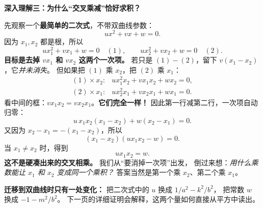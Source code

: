 \begin{explanationbox}
\textbf{深入理解三：为什么“交叉乘减”恰好求积？}

先观察一个\textbf{最简单的二次式}，不带双曲线参数：
\[
 ux^2+vx+w=0.
\]
因为 $x_1,x_2$ 都是根，所以
\[
 ux_1^2+vx_1+w=0\quad(1),\qquad
 ux_2^2+vx_2+w=0\quad(2).
\]
\textbf{目标是去掉 $vx_1$ 和 $vx_2$ 这两个一次项。}
若只是 $(1)-(2)$，留下 $v(x_1-x_2)$，它\emph{并未消失}。
但如果把 $(1)$ 乘 $x_2$，把 $(2)$ 乘 $x_1$：
\[
\begin{array}{rcl}
 (1)\times x_2: & ux_1^2x_2+\boxed{vx_1x_2}+wx_2=0,\\[3pt]
 (2)\times x_1: & ux_2^2x_1+\boxed{vx_2x_1}+wx_1=0.
\end{array}
\]
看中间的框：$vx_1x_2=vx_2x_1$。\textbf{它们完全一样！}
因此第一行减第二行，一次项自动归零：
\[
 u\,x_1x_2(x_1-x_2)+w(x_2-x_1)=0.
\]
又因为 $x_2-x_1=-(x_1-x_2)$，所以
\[
 (x_1-x_2)(ux_1x_2-w)=0.
\]
当 $x_1\ne x_2$ 时，得到
\[
 \boxed{ux_1x_2=w}.
\]
\textbf{这不是硬凑出来的交叉相乘。} 我们从“要消掉一次项”出发，
倒过来想：\emph{用什么乘数能让 $x_1$ 和 $x_2$ 变成同一个乘积？}
答案当然是第一个乘 $x_2$、第二个乘 $x_1$。

\textbf{迁移到双曲线时只有一处变化：}
把二次式中的 $u$ 换成 $1/a^2-k^2/b^2$，
把常数 $w$ 换成 $-1-m^2/b^2$。
下一页的详细证明会解释，这两个量如何直接从平方中读出。
\end{explanationbox}
\clearpage
